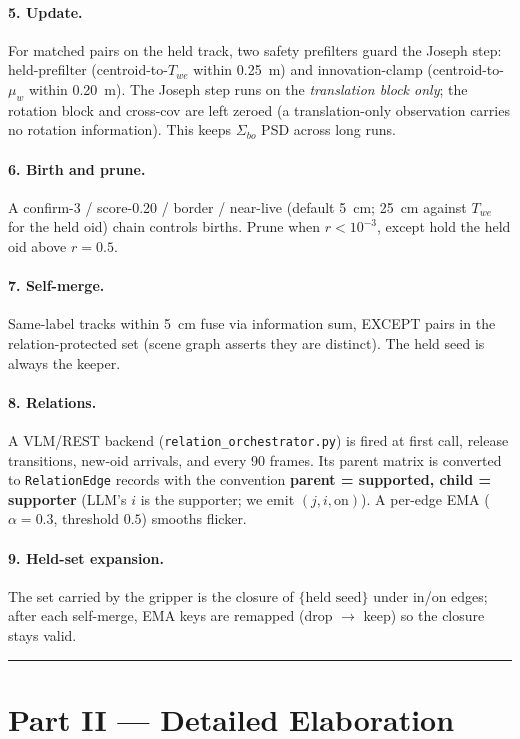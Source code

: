 \documentclass[11pt]{article}
\newcommand{\file}[1]{\texttt{#1}}
\begin{document}
\paragraph{5. Update.} For matched pairs on the held track, two
safety prefilters guard the Joseph step:
held-prefilter (centroid-to-$T_{we}$ within 0.25~m) and
innovation-clamp (centroid-to-$\mu_w$ within 0.20~m). The Joseph step
runs on the \emph{translation block only}; the rotation block and
cross-cov are left zeroed (a translation-only observation carries no
rotation information). This keeps $\Sigma_{bo}$ PSD across long runs.

\paragraph{6. Birth and prune.} A confirm-3 / score-0.20 / border /
near-live (default 5~cm; 25~cm against $T_{we}$ for the held oid)
chain controls births. Prune when $r<10^{-3}$, except hold the held
oid above $r=0.5$.

\paragraph{7. Self-merge.} Same-label tracks within 5~cm fuse via
information sum, EXCEPT pairs in the relation-protected set
(scene graph asserts they are distinct). The held seed is always
the keeper.

\paragraph{8. Relations.} A VLM/REST backend
(\file{relation\_orchestrator.py}) is fired at first call,
release transitions, new-oid arrivals, and every 90 frames. Its
parent matrix is converted to \texttt{RelationEdge} records with the
convention \textbf{parent = supported, child = supporter} (LLM's $i$
is the supporter; we emit $(j,i,\text{on})$). A per-edge EMA
($\alpha=0.3$, threshold $0.5$) smooths flicker.

\paragraph{9. Held-set expansion.} The set carried by the gripper is
the closure of $\{\text{held seed}\}$ under in/on edges; after each
self-merge, EMA keys are remapped (drop $\to$ keep) so the closure
stays valid.

\bigskip\hrule\bigskip

\section*{Part II — Detailed Elaboration}
\label{sec:detail}
\end{document}
